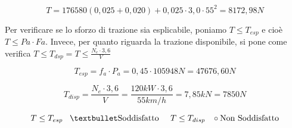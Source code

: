 \documentclass[
a4paper,
12pt, 
twoside]{scrbook}
\begin{document}
    {
     \centering
    
    \begin{equation}
    	T=176580(0,025+0,020)+0,025\cdot 3,0\cdot 55^{2}=8172,98N
    \end{equation}
    
    \begin{boxF}
    	Per verificare se lo sforzo di trazione sia esplicabile, poniamo $T\leq T_{esp}$ e cioè $T\leq Pa\cdot Fa$. Invece, per quanto riguarda la trazione disponibile, si pone come verifica $T\leq T_{dsp}=T\leq \frac{N_e\cdot 3,6}{V}$
    \end{boxF}
    \leavevmode\newline
    {
    	\centering
    	
    \begin{equation}
    	T_{esp}=f_{a}\cdot P_{a}= 0,45\cdot 105948N= 47676,60N
    \end{equation}
    
    \begin{equation}
    	T_{disp}=\frac{N_e\cdot 3,6}{V}=\frac{120kW\cdot 3,6}{55km/h}=7,85kN=7850N
    \end{equation}
    
    \begin{equation}
    	T\leq T_{esp}\phantom{...}\textbullet\textnormal{Soddisfatto}\phantom{.....} T\leq T_{disp}\phantom{...}\circ\textnormal{Non Soddisfatto}
    \end{equation}
    \leavevmode\newline
    \leavevmode\newline
}}
\end{document}
